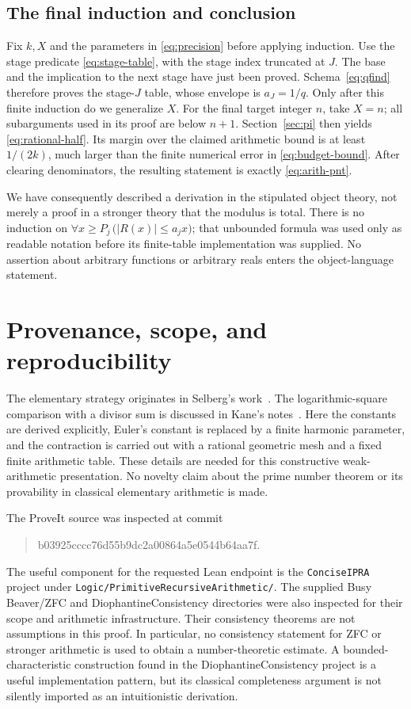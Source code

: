 \documentclass[11pt]{article}
\theoremstyle{definition}
\theoremstyle{remark}
\begin{document}
\subsection{The final induction and conclusion}

Fix $k,X$ and the parameters in \eqref{eq:precision} before applying
induction. Use the stage predicate \eqref{eq:stage-table}, with the stage
index truncated at $J$. The base and the implication to the next stage have
just been proved. Schema~\eqref{eq:qfind} therefore proves the stage-$J$
table, whose envelope is $a_J=1/q$.
Only after this finite induction do we generalize $X$. For the final target
integer $n$, take $X=n$; all subarguments used in its proof are below $n+1$.
Section~\ref{sec:pi} then yields \eqref{eq:rational-half}. Its margin over
the claimed arithmetic bound is at least $1/(2k)$, much larger than the
finite numerical error in \eqref{eq:budget-bound}. After clearing denominators,
the resulting statement is exactly \eqref{eq:arith-pnt}.

We have consequently described a derivation in the stipulated object theory,
not merely a proof in a stronger theory that the modulus is total.
There is no induction on
$\forall x\ge P_j\,\bigl(|R(x)|\le a_jx\bigr)$; that unbounded
formula was used only as readable notation before its finite-table
implementation was supplied. No assertion about arbitrary functions or
arbitrary reals enters the object-language statement.



\section{Provenance, scope, and reproducibility}

The elementary strategy originates in Selberg's work~\cite{selberg}.
The logarithmic-square comparison with a divisor sum is discussed in
Kane's notes~\cite{kane}. Here the constants are derived explicitly,
Euler's constant is replaced by a finite harmonic parameter, and the
contraction is carried out with a rational geometric mesh and a fixed
finite arithmetic table. These details are needed for this constructive
weak-arithmetic presentation. No novelty claim about the prime number
theorem or its provability in classical elementary arithmetic is made.

The ProveIt source was inspected at commit
\begin{quote}\small\ttfamily
b03925cccc76d55b9dc2a00864a5e0544b64aa7f.
\end{quote}
The useful component for the requested Lean endpoint is the
\texttt{ConciseIPRA} project under
\texttt{Logic/PrimitiveRecursiveArithmetic/}.
The supplied Busy Beaver/ZFC and DiophantineConsistency directories were
also inspected for their scope and arithmetic infrastructure. Their
consistency theorems are not assumptions in this proof. In particular,
no consistency statement for ZFC or stronger arithmetic is used to obtain
a number-theoretic estimate. A bounded-characteristic construction found
in the DiophantineConsistency project is a useful implementation pattern,
but its classical completeness argument is not silently imported as an
intuitionistic derivation.
\end{document}
